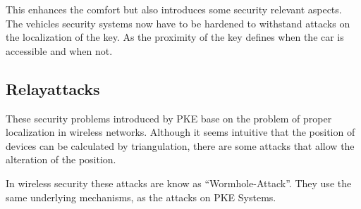This enhances the comfort but also introduces some security relevant aspects.
The vehicles security systems now have to be hardened
to withstand attacks on the localization of the key.
As the proximity of the key defines when the car is accessible and when not. 

\subsection*{Relayattacks}
These security problems introduced by PKE base on the problem of proper
localization in wireless networks.
Although it seems intuitive that the position of devices can be calculated by
triangulation, there are some attacks that allow the alteration of the position.


In wireless security these attacks are know as ``Wormhole-Attack''.
They use the same underlying mechanisms, as the attacks on PKE Systems.

